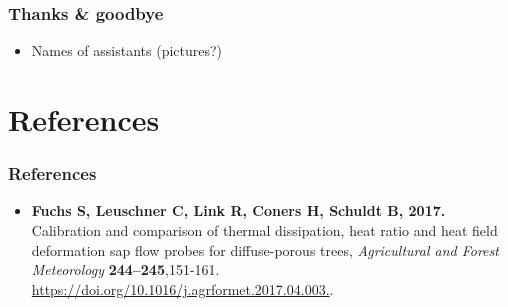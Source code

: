 \documentclass[usepdftitle=false]{beamer}
\begin{document}
\begin{frame}
	\frametitle{Thanks \& goodbye}
	\begin{itemize}
		\item Names of assistants (pictures?)
	\end{itemize}
\end{frame}

\section{References}
\begin{frame}
	\frametitle{References}
	\begin{itemize}
		\item \textbf{Fuchs S, Leuschner C, Link R, Coners H, Schuldt B, 2017.}
		Calibration and comparison of thermal dissipation, heat ratio and heat field deformation sap flow probes for diffuse-porous trees,
		\textit{Agricultural and Forest Meteorology} \textbf{244–245},151-161. \url{https://doi.org/10.1016/j.agrformet.2017.04.003.}.
	\end{itemize}
\end{frame}
\end{document}
